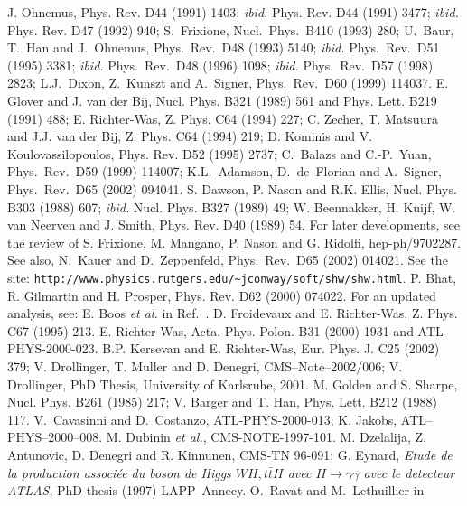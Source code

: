 \begin{thebibliography}{999}
J. Ohnemus, Phys. Rev. D44 (1991) 1403; {\it ibid.}  Phys. Rev. D44 (1991) 
3477; {\it ibid.} Phys. Rev. D47 (1992) 940; 
S.~Frixione, Nucl.~Phys.~B410 (1993) 280; U.~Baur, T.~Han and 
J.~Ohnemus, Phys.~Rev.~D48 (1993) 5140; {\it ibid.} Phys.~Rev.~D51 (1995) 3381; 
{\it ibid.} Phys.~Rev.~D48 (1996) 1098; {\it ibid.} Phys.~Rev.~D57 (1998) 2823;
L.J.\ Dixon, Z.\ Kunszt and A.\ Signer, Phys.~Rev.~D60 (1999) 114037.
%
 E. Glover and J. van der Bij, Nucl. Phys. B321 (1989) 561
and  Phys. Lett. B219 (1991) 488;
E. Richter-Was, Z. Phys. C64 (1994) 227; 
C. Zecher, T. Matsuura and J.J. van der Bij, Z. Phys. C64 (1994) 219; 
D. Kominis and V. Koulovassilopoulos, Phys. Rev. D52 (1995) 2737;   
C.~Balazs and C.-P.~Yuan, Phys.\ Rev.\ D59 (1999) 114007;  
K.L.~Adamson, D.~de~Florian and A.~Signer, Phys.\ Rev.\ D65 (2002) 094041.
%
 S. Dawson, P. Nason and R.K. Ellis, Nucl. Phys. B303 (1988)
607; {\it ibid.} Nucl. Phys. B327 (1989) 49; W. Beennakker, H. Kuijf, W. van 
Neerven and J. Smith, Phys. Rev. D40 (1989) 54. For later developments, see the
review of S. Frixione, M. Mangano, P. Nason and G. Ridolfi, hep-ph/9702287. 
See also,  N.~Kauer and D.~Zeppenfeld, Phys.\ Rev.\ D65 (2002) 014021.
%
 See the site:
{\verb+http://www.physics.rutgers.edu/~jconway/soft/shw/shw.html+}.  
%
 P. Bhat, R. Gilmartin and H. Prosper, Phys. Rev. D62 
(2000) 074022.
%
 For an updated analysis, see: E. Boos {\it et al.} in 
Ref.~\cite{Houches2003}.
%
 D. Froidevaux and E. Richter-Was, Z. Phys. C67 
(1995) 213. 
%
 E. Richter-Was, Acta. Phys. Polon. B31 (2000) 
1931 and ATL-PHYS-2000-023.
%
B.P. Kersevan and E. Richter-Was, Eur. Phys. J. C25 (2002) 379; 
V. Drollinger, T. Muller and D. Denegri, CMS--Note--2002/006;
V. Drollinger, PhD Thesis, University of Karlsruhe, 2001. 
%
 M. Golden and S. Sharpe, Nucl. Phys. B261 (1985) 217;
V. Barger and T. Han, Phys. Lett. B212 (1988) 117. 
%
 V.~Cavasinni and D.~Costanzo, ATL-PHYS-2000-013;
K. Jakobs, ATL--PHYS--2000--008.   
%
 M. Dubinin {\it et al.}, CMS-NOTE-1997-101. 
%
M. Dzelalija, Z. Antunovic, D. Denegri and R. Kinnunen, CMS-TN 96-091; 
G. Eynard, {\it Etude de la production associ\'ee du boson de Higgs $WH, t\bar 
t H$ avec $H\to \gamma \gamma$ avec le detecteur ATLAS}, PhD thesis (1997) 
LAPP--Annecy. 
%
 O.\, Ravat and M.\, Lethuillier in 

\end{thebibliography}
